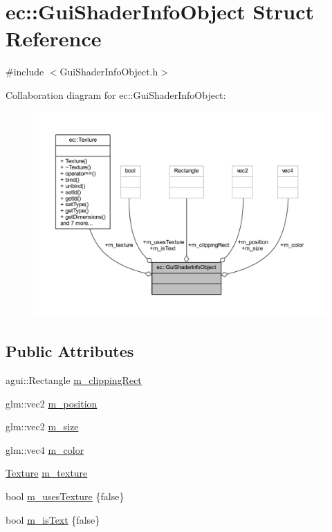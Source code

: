 \hypertarget{structec_1_1_gui_shader_info_object}{}\section{ec\+:\+:Gui\+Shader\+Info\+Object Struct Reference}
\label{structec_1_1_gui_shader_info_object}


{\ttfamily \#include $<$Gui\+Shader\+Info\+Object.\+h$>$}



Collaboration diagram for ec\+:\+:Gui\+Shader\+Info\+Object\+:\nopagebreak
\begin{figure}[H]
\begin{center}
\leavevmode
\includegraphics[width=350pt]{structec_1_1_gui_shader_info_object__coll__graph}
\end{center}
\end{figure}
\subsection*{Public Attributes}
\begin{DoxyCompactItemize}
\item 
agui\+::\+Rectangle \mbox{\hyperlink{structec_1_1_gui_shader_info_object_ab24686318cc8ad087ab9bc5340ed2039}{m\+\_\+clipping\+Rect}}
\item 
glm\+::vec2 \mbox{\hyperlink{structec_1_1_gui_shader_info_object_afff54f995320a1595bd59a68b98a8b4d}{m\+\_\+position}}
\item 
glm\+::vec2 \mbox{\hyperlink{structec_1_1_gui_shader_info_object_ac0d60eba17cc5202cb3a437ccec71926}{m\+\_\+size}}
\item 
glm\+::vec4 \mbox{\hyperlink{structec_1_1_gui_shader_info_object_adad3efd30731997e995a57b980c31bfb}{m\+\_\+color}}
\item 
\mbox{\hyperlink{classec_1_1_texture}{Texture}} \mbox{\hyperlink{structec_1_1_gui_shader_info_object_a80f6058638a7da161d3f30cdb771355c}{m\+\_\+texture}}
\item 
bool \mbox{\hyperlink{structec_1_1_gui_shader_info_object_af9f670fe1830664d40f9f9349be47ac5}{m\+\_\+uses\+Texture}} \{false\}
\item 
bool \mbox{\hyperlink{structec_1_1_gui_shader_info_object_aa306257232ebca60174628d3b13a9173}{m\+\_\+is\+Text}} \{false\}
\end{DoxyCompactItemize}


